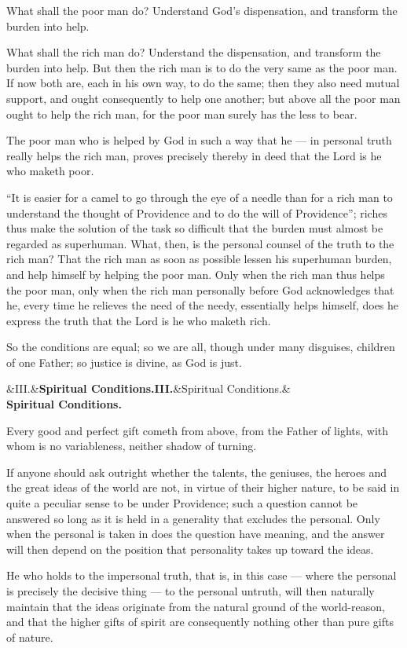 \documentclass[12pt,a4paper,openany]{book}
\newcommand{\opage}[1]{\marginnote{\footnotesize\textit{[#1]}}}
\newcommand{\stykke}[2]{\begin{center}\ifx&#1&\textbf{#2}\else\textbf{#1}\ifx&#2&\else\\[0.2em]\textbf{#2}\fi\fi\end{center}}
\begin{document}
What shall the poor man do? Understand God's
dispensation, and transform the burden into help.

What shall the rich man do? Understand the dispensation,
and transform the burden into help. But
then the rich man is to do the very same as
the poor man. If now both are, each in his own
way, to do the same; then they also need mutual support, and
ought consequently to help one another; but above all the poor man ought to
help the rich man, for the poor man surely has
the less to bear.

\setcounter{footnote}{0}%
\opage{63}The poor man who is helped by God in such a way
that he --- in personal truth really helps
the rich man, proves precisely thereby in deed that
the Lord is he who maketh poor.

``It is easier for a camel to go through
the eye of a needle than for a rich man to understand the thought
of Providence and to do the will of Providence''; riches
thus make the solution of the task so difficult that
the burden must almost be regarded as superhuman.
What, then, is the personal counsel of the truth
to the rich man? That the rich man as soon as possible lessen
his superhuman burden, and help
himself by helping the poor man. Only when the
rich man thus helps the poor man, only when
the rich man personally before God acknowledges that he,
every time he relieves the need of the
needy, essentially helps himself, does he express
the truth that the Lord is he who maketh
rich.

So the conditions are equal; so we are all,
though under many disguises, children of one
Father; so justice is divine,
as God is just.

\setcounter{footnote}{0}%
\opage{64}\stykke{III.}{Spiritual Conditions.}

Every good and perfect gift cometh from above, from
the Father of lights, with whom is no variableness,
neither shadow of turning.

If anyone should ask outright whether the talents,
the geniuses, the heroes and the great ideas of the world
are not, in virtue of their higher nature, to be said in
quite a peculiar sense to be under Providence;
such a question cannot be answered
so long as it is held in a generality
that excludes the personal. Only when the
personal is taken in does the question
have meaning, and the answer will then depend
on the position that personality takes up
toward the ideas.

He who holds to the impersonal
truth, that is, in this case --- where the
personal is precisely the decisive thing --- to the
personal untruth, will then naturally maintain
that the ideas originate from the natural ground
of the world-reason, and that the higher gifts of spirit are consequently nothing other than pure gifts of nature.
\end{document}
